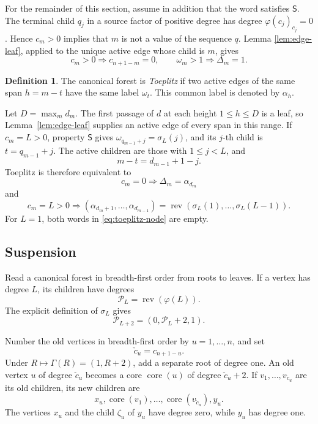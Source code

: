 \documentclass[11pt]{article}
\theoremstyle{definition}
\newtheorem{definition}[theorem]{Definition}
\theoremstyle{remark}
\DeclareMathOperator{\rev}{rev}
\begin{document}
For the remainder of this section, assume in addition that the word satisfies
\(\mathsf S\).  The terminal child \(q_j\) in a source factor
of positive degree has degree \(\varphi(c_j)_{c_j}=0\).  Hence \(c_m>0\)
implies that \(m\) is not a value of the sequence \(q\).  Lemma
\ref{lem:edge-leaf}, applied to the unique active edge whose child is \(m\),
gives
\begin{equation}
\label{eq:positive-degree-mirror}
 c_m>0\Longrightarrow c_{n+1-m}=0,
 \qquad
 \omega_m>1\Longrightarrow\Delta_m=1.
\end{equation}

\begin{definition}
The canonical forest is \emph{Toeplitz} if two active edges of the same span
\(h=m-t\) have the same label \(\omega_t\).  This common label is denoted by
\(\alpha_h\).
\end{definition}

Let \(D=\max_m d_m\).  The first passage of \(d\) at each height
\(1\leq h\leq D\) is a leaf, so Lemma~\ref{lem:edge-leaf} supplies an active
edge of every span in this range.  If \(c_m=L>0\), property \(\mathsf S\)
gives \(\omega_{q_{m-1}+j}=\sigma_L(j)\), and its \(j\)-th child is
\(t=q_{m-1}+j\).  The active children are those with \(1\leq j<L\), and
\[
 m-t=d_{m-1}+1-j.
\]
Toeplitz is therefore equivalent to
\begin{equation}
\label{eq:toeplitz-leaf}
 c_m=0\Longrightarrow\Delta_m=\alpha_{d_m}
\end{equation}
and
\begin{equation}
\label{eq:toeplitz-node}
 c_m=L>0\Longrightarrow
 (\alpha_{d_m+1},\ldots,\alpha_{d_{m-1}})
 =\rev(\sigma_L(1),\ldots,\sigma_L(L-1)).
\end{equation}
For \(L=1\), both words in \eqref{eq:toeplitz-node} are empty.

\subsection{Suspension}

Read a canonical forest in breadth-first order from roots to leaves.  If a
vertex has degree \(L\), its children have degrees
\[
 \mathscr P_L=\rev(\varphi(L)).
\]
The explicit definition of \(\sigma_L\) gives
\begin{equation}
\label{eq:gadget-identity}
 \mathscr P_{L+2}=(0,\mathscr P_L+2,1).
\end{equation}

Number the old vertices in breadth-first order by \(u=1,\ldots,n\), and set
\[
 \check c_u=c_{n+1-u}.
\]
Under \(R\mapsto\Gamma(R)=(1,R+2)\), add a separate root of degree one.  An
old vertex \(u\) of degree \(\check c_u\) becomes a core \(\operatorname{core}(u)\) of degree
\(\check c_u+2\).  If \(v_1,\ldots,v_{\check c_u}\) are its old children, its new children
are
\begin{equation*}
 x_u,\operatorname{core}(v_1),\ldots,\operatorname{core}(v_{\check c_u}),y_u.
\end{equation*}
The vertices \(x_u\) and the child \(\zeta_u\) of \(y_u\) have degree zero,
while \(y_u\) has degree one.
\end{document}
